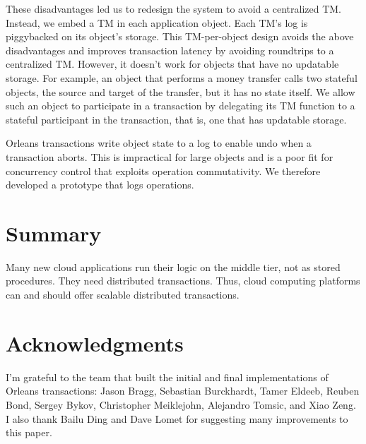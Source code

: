 \documentclass[11pt]{article}
\begin{document}
These disadvantages led us to redesign the system to avoid a centralized TM. Instead, we embed a TM in each application object. Each TM's log is piggybacked on its object's storage. This TM-per-object design avoids the above disadvantages and improves transaction latency by avoiding roundtrips to a centralized TM. However, it doesn't work for objects that have no updatable storage. For example, an object that performs a money transfer calls two stateful objects, the source and target of the transfer, but it has no state itself. We allow such an object to participate in a transaction by delegating its TM function to a stateful participant in the transaction, that is, one that has updatable storage.  

Orleans transactions write object state to a log to enable undo when a transaction aborts. This is impractical for large objects and is a poor fit for concurrency control that exploits operation commutativity. We therefore developed a prototype that logs operations.  
\section{Summary}
Many new cloud applications run their logic on the middle tier, not as stored procedures. They need distributed transactions. Thus, cloud computing platforms can and should offer scalable distributed transactions.  
\section{Acknowledgments}
I'm grateful to the team that built the initial and final implementations of Orleans transactions: Jason Bragg, Sebastian Burckhardt, Tamer Eldeeb, Reuben Bond, Sergey Bykov, Christopher Meiklejohn, Alejandro Tomsic, and Xiao Zeng. I also thank Bailu Ding and Dave Lomet for suggesting many improvements to this paper. 
 
\end{document}
